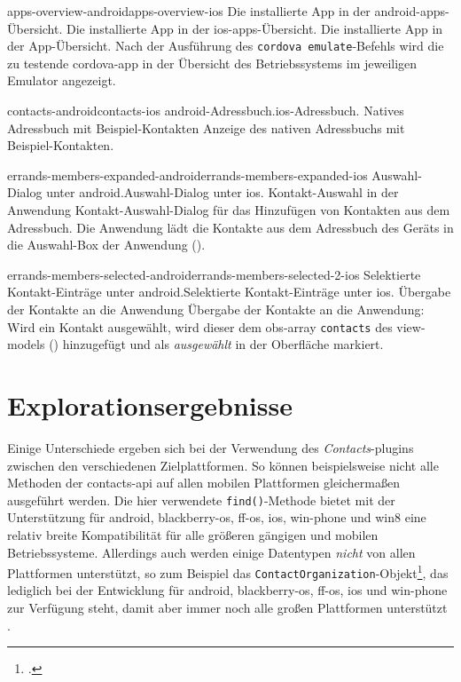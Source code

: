 	
	\pagebreak
	
	{apps-overview-android}{apps-overview-ios}
	{Die installierte App in der \gls{android}-\glspl{app}-Übersicht.}
	{Die installierte App in der \gls{ios}-\glspl{app}-Übersicht.}
	{Die installierte App in der App-Übersicht.}
	{Nach der Ausführung des \lstinline|cordova emulate|-Befehls wird die zu testende \gls{cordova}-\gls{app} in der Übersicht des Betriebssystems im jeweiligen Emulator angezeigt.}
	{\ownScreenshot}
	
	{contacts-android}{contacts-ios}
	{\gls{android}-Adressbuch.}{\gls{ios}-Adressbuch.}
	{Natives Adressbuch mit Beispiel-Kontakten}
	{Anzeige des nativen Adressbuchs mit Beispiel-Kontakten.}
	{\ownScreenshot}
	
	{errands-members-expanded-android}{errands-members-expanded-ios}
	{Auswahl-Dialog unter \gls{android}.}{Auswahl-Dialog unter \gls{ios}.}
	{Kontakt-Auswahl in der Anwendung}
	{Kontakt-Auswahl-Dialog für das Hinzufügen von Kontakten aus dem Adressbuch. Die Anwendung lädt die Kontakte aus dem Adressbuch des Geräts in die Auswahl-Box der Anwendung ().}
	{\ownScreenshot}
	
	{errands-members-selected-android}{errands-members-selected-2-ios}
	{Selektierte Kontakt-Einträge unter \gls{android}.}{Selektierte Kontakt-Einträge unter \gls{ios}.}
	{Übergabe der Kontakte an die Anwendung}
	{Übergabe der Kontakte an die Anwendung: Wird ein Kontakt ausgewählt, wird dieser dem \gls{obs}-\gls{array} \lstinline|contacts| des \glspl{view-model} () hinzugefügt und als \emph{ausgewählt} in der Oberfläche markiert.}
	{\ownScreenshot}
	
	\pagebreak
	
\section{Explorationsergebnisse} \label{sec:contacts-ergebnis}
Einige Unterschiede ergeben sich bei der Verwendung des \emph{Contacts}-\glspl{plugin} zwischen den verschiedenen Zielplattformen.
So können beispielsweise nicht alle Methoden der \gls{contacts-api} auf allen mobilen Plattformen gleichermaßen ausgeführt werden.
Die hier verwendete \lstinline|find()|-Methode bietet mit der Unterstützung für \gls{android}, \gls{blackberry-os}, \gls{ff-os}, \gls{ios}, \gls{win-phone} und \gls{win8} eine relativ  breite Kompatibilität für alle größeren gängigen und mobilen Betriebssysteme.
Allerdings auch werden einige Datentypen \emph{nicht} von allen Plattformen unterstützt, so zum Beispiel das \lstinline|ContactOrganization|-Objekt\footnote{.}, das lediglich bei der Entwicklung für \gls{android}, \gls{blackberry-os}, \gls{ff-os}, \gls{ios} und \gls{win-phone} zur Verfügung steht, damit aber immer noch alle großen Plattformen unterstützt \cite{Cordova_Plugin_Registry_Contacts}.

